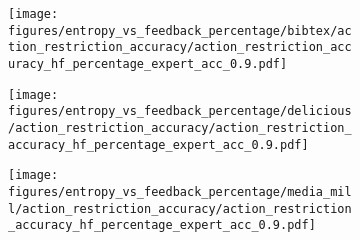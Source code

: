 \begin{figure}[t]
    \begin{subfigure}[b]{0.32\columnwidth}
        \centering
        \texttt{[image: figures/entropy\_vs\_feedback\_percentage/bibtex/action\_restriction\_accuracy/action\_restriction\_accuracy\_hf\_percentage\_expert\_acc\_0.9.pdf]}
    \end{subfigure}
    \hfill
    \begin{subfigure}[b]{0.32\columnwidth}
        \centering
        \texttt{[image: figures/entropy\_vs\_feedback\_percentage/delicious/action\_restriction\_accuracy/action\_restriction\_accuracy\_hf\_percentage\_expert\_acc\_0.9.pdf]}
    \end{subfigure}
    \hfill
    \begin{subfigure}[b]{0.32\columnwidth}
        \centering
        \texttt{[image: figures/entropy\_vs\_feedback\_percentage/media\_mill/action\_restriction\_accuracy/action\_restriction\_accuracy\_hf\_percentage\_expert\_acc\_0.9.pdf]}
    \end{subfigure}
    \hfill
   
   
\end{figure}




